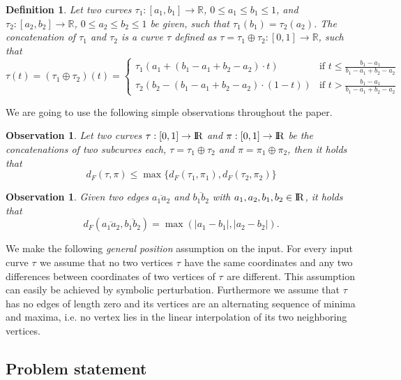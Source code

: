 \documentclass[11pt, letter]{article}
\newtheorem{definition}[theorem]{Definition}
\newtheorem{observation}[theorem]{Observation}
\newcommand{\seclab}[1]{\label{sec:#1}}
\newcommand{\deflab}[1]{\label{def:#1}}
\newcommand{\obslab}[1]{\label{obs:#1}}
\providecommand{\pth}[2][\!]{#1\left({#2}\right)}
\renewcommand{\Re}{{\rm I\!\hspace{-0.025em} R}}
\newcommand{\trajectory}[2]{\ensuremath{{#1}_{#2}}}
\newcommand{\inputSym}{\ensuremath{\tau}}
\newcommand{\inputTraj}[1]{\trajectory{\inputSym}{#1}}
\newcommand{\distFr}[2]{\ensuremath{d_F\pth{#1,#2}}}
\begin{document}
\begin{definition}\deflab{concatenation}
Let two curves $\tau_1:[a_1,b_1]\rightarrow\mathbb{R}$, $0\leq a_1\leq b_1\leq 1$, and $\tau_2:[a_2,b_2]\rightarrow\mathbb{R}$, $0\leq a_2\leq b_2\leq 1$ be given, such that $\tau_1(b_1)=\tau_2(a_2)$. The concatenation of $\tau_1$ and $\tau_2$ is a curve $\tau$ defined as $\tau=\tau_1\oplus\tau_2:[0,1]\rightarrow\mathbb{R}$, such that 
\[ \tau(t)=\left(\tau_1\oplus\tau_2\right)(t)=\begin{cases}\tau_1\left(a_1+\left(b_1-a_1+b_2-a_2\right)\cdot t\right) & \text{if  } t\leq \frac{b_1-a_1}{b_1-a_1+b_2-a_2}
\\ \tau_2\left(b_2-\left(b_1-a_1+b_2-a_2\right)\cdot \left(1-t\right)\right) & \text{if  } t> \frac{b_1-a_1}{b_1-a_1+b_2-a_2} 
\end{cases}\]

\end{definition}

We are going to use the following simple observations throughout the paper. 
\begin{observation}\obslab{fd:concat}
Let two curves $\tau:[0,1]\rightarrow \Re$ and $\pi:[0,1]\rightarrow \Re$
be the concatenations of two subcurves each, $\tau=\tau_1\oplus \tau_2$ and
$\pi=\pi_1\oplus \pi_2$, then it holds  that \[\distFr{\tau}{\pi}\leq \max\lbrace
\distFr{\tau_1}{\pi_1}, \distFr{\tau_2}{\pi_2}\rbrace\]
\end{observation}

\begin{observation}\obslab{segments}
Given two edges $\overline{a_1 a_2}$ and $\overline{b_1 b_2}$ with $a_1,a_2,b_1,b_2\in \Re$, it holds that 
\[\distFr{\overline{a_1 a_2}}{\overline{b_1 b_2}}=\max\pth{|a_1-b_1|,|a_2-b_2|}.\]
\end{observation}

We make the following \emph{general position} assumption on the input. For every
input curve $\inputTraj{}$ we assume that no two vertices $\inputTraj{}$ have
the same coordinates and any two differences between coordinates of two
vertices of $\inputTraj{}$ are different. This assumption can easily be achieved
by symbolic perturbation. Furthermore we assume that $\inputTraj{}$ has no edges 
of length zero and its vertices are an alternating sequence of minima and
maxima, i.e. no vertex lies in the linear interpolation of its two neighboring vertices.

\subsection{Problem statement}
\seclab{problem}
\end{document}
